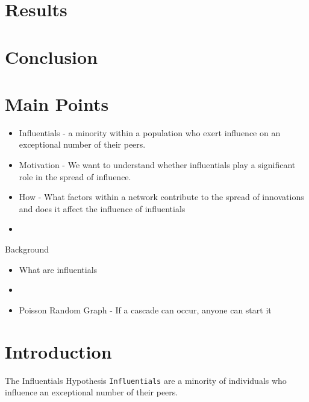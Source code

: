 \documentclass[10pt, oneside, reqno]{amsart}
\makeatletter
\theoremstyle{plain}%
\theoremstyle{definition}
\theoremstyle{remark}
\renewcommand\subsection{\@startsection{subsection}{2}%
  \z@{.5\linespacing\@plus.7\linespacing}{-.5em}%
  {\normalfont\scshape}}
\makeatother
\begin{document}
\section{Results}




\section{Conclusion}







\section{Main Points}

\begin{itemize}
    \item Influentials - a minority within a population who exert influence on an exceptional number of their peers.
    \item Motivation - We want to understand whether influentials play a significant role in the spread of influence.
    \item How - What factors within a network contribute to the spread of innovations and does it affect the influence of influentials
    \item 
\end{itemize}


Background 
\begin{itemize}
    \item What are influentials 
    \item 
\end{itemize}

\begin{itemize}
    \item Poisson Random Graph - If a cascade can occur, anyone can start it
\end{itemize}

\section{Introduction}

\subsection{The Influentials Hypothesis}
\texttt{Influentials} are a minority of individuals who influence an exceptional 
number of their peers. 
\end{document}

